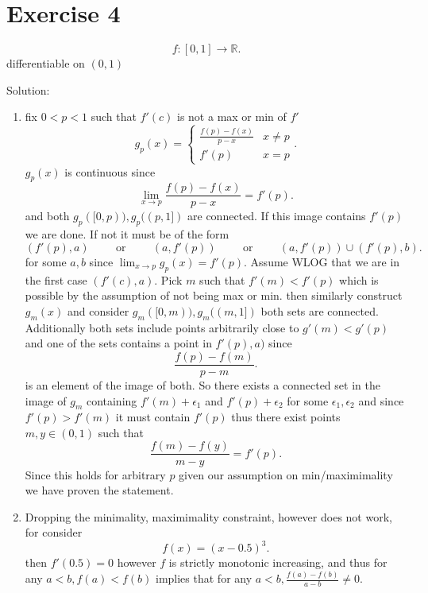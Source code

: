 \documentclass[11pt]{article}
\newcommand{\solution}[1]{{{\textcolor{header}{Solution:} \textcolor{solution}{#1}}}}
\begin{document}
\section{Exercise 4}
\[
    f: [0,1] \rightarrow \mathbb{R}
.\] 
differentiable on $(0,1)$
\solution{
    \begin{enumerate}
        \item fix $0 < p < 1$ such that $f'(c)$ is not a max or min of $f'$ 
     \[
     g_p(x) = 
     \begin{cases}
         \frac{f(p)-f(x)}{p-x} & x \ne p\\
         f'(p) & x = p
     \end{cases}
     .\] 
     $g_p(x)$ is continuous since 
     \[
     \lim_{x\to p} \frac{f(p)-f(x)}{p-x} = f'(p)
     .\] 
     and both $g_p([0,p)), g_p((p,1])$ are connected. If this image contains $f'(p)$ we are done. If not it must be of the form
      \[
          (f'(p),a) \hspace{1cm} \text{or} \hspace{1cm} (a, f'(p)) \hspace{1cm} \text{or} \hspace{1cm} (a,f'(p)) \cup (f'(p),b)
     .\] 
     for some $a,b$ since $\lim_{x\to p}g_p(x) = f'(p)$. Assume WLOG that we are in the first case $(f'(c),a)$.
     Pick $m$ such that  $f'(m) < f'(p)$ which is possible by the assumption of not being max or min.
     then similarly construct  $g_m(x)$ and consider  $g_m([0,m)), g_m((m,1])$ both sets are connected.
     Additionally both sets include points arbitrarily close to $g'(m) < g'(p)$ and one of the sets contains a point in  $f'(p),a)$ since
      \[
          \frac{f(p) - f(m)}{p-m}
     .\] 
     is an element of the image of both. So there exists a connected set in the image of $g_m$ containing  $f'(m) + \epsilon_1$ and $f'(p) + \epsilon_2$ for some $\epsilon_1, \epsilon_2$
     and since $f'(p) > f'(m)$ it must contain  $f'(p)$ thus there exist points  $m, y \in (0,1)$ such that
      \[
          \frac{f(m) - f(y)}{m-y} = f'(p)
     .\] 
     Since this holds for arbitrary $p$ given our assumption on min/maximimality we have proven the statement.
 \item Dropping the minimality, maximimality constraint, however does not work, for consider
     \[
     f(x) = (x-0.5)^{3}
     .\] 
     then
     $f'(0.5) = 0$
     however  $f$ is strictly monotonic increasing, and thus for any $a< b, f(a) < f(b)$ implies that for any $a< b, \frac{f(a)-f(b)}{a-b} \ne 0$.
\end{enumerate}
}
\end{document}
